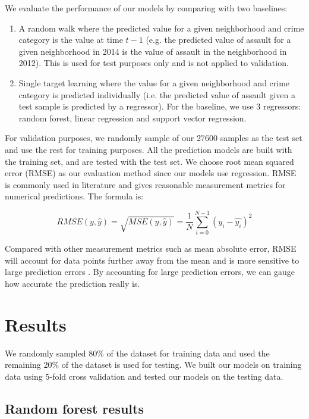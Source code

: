 \documentclass{article}
\begin{document}
We evaluate the performance of our models by comparing with two baselines:
\begin{enumerate}
  \item A random walk where the predicted value for a given neighborhood and crime category is the value at time $t-1$ (e.g. the predicted value of assault for a given neighborhood in 2014 is the value of assault in the neighborhood in 2012). This is used for test purposes only and is not applied to validation.
  \item Single target learning where the value for a given neighborhood and crime category is predicted individually (i.e. the predicted value of assault given a test sample is predicted by a regressor). For the baseline, we use 3 regressors: random forest, linear regression and support vector regression.
\end{enumerate}

For validation purposes, we randomly sample  of our 27600 samples as the test set and use the rest for training purposes. All the prediction models are built with the training set, and are tested with the test set. We choose root mean squared error (RMSE) as our evaluation method since our models use regression. RMSE is commonly used in literature and gives reasonable measurement metrics for numerical predictions. The formula is:

$$RMSE(y, \hat{y}) = \sqrt{MSE(y, \hat{y})} = \frac{1}{N}\sum_{i=0}^{N-1}(y_{i}-\hat{y_{i}})^{2}$$

Compared with other measurement metrics such as mean absolute error, RMSE will account for data points further away from the mean and is more sensitive to large prediction errors \citep{willmott_advantages_2005}. By accounting for large prediction errors, we can gauge how accurate the prediction really is.

\section{Results}
\label{discussion}

We randomly sampled 80\% of the dataset for training data and used the remaining 20\% of the dataset is used for testing. We built our models on training data using 5-fold cross validation and tested our models on the testing data.

\subsection{Random forest results}
\end{document}
